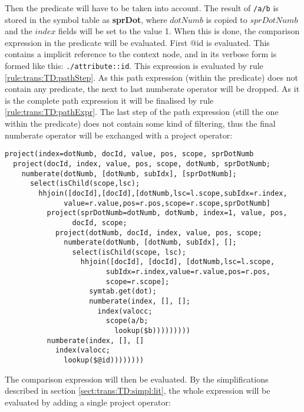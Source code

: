 Then the predicate will have to be taken into account. The result of \texttt{/a/b} is stored in the symbol table
as \textbf{sprDot}, where $dotNumb$ is copied to $sprDotNumb$ and the $index$ fields will be set to the
value 1. When this is done, the comparison expression in the predicate will be evaluated. First \textsf{@id} is
evaluated. This contains a implicit reference to the context node, and in its verbose form is formed like this:
\texttt{./attribute::id}. This expression is evaluated by rule \ref{rule:trans:TD:pathStep}. As this path
expression (within the predicate) does not contain any predicate, the next to last \textsf{numberate} operator
will be dropped. As it is the complete path expression it will be finalised by rule \ref{rule:trans:TD:pathExpr}.
The last step of the path expression (still the one within the predicate) does not contain some kind of filtering,
thus the final \textsf{numberate} operator will be exchanged with a \textsf{project} operator:

\begin{Verbatim}
project(index=dotNumb, docId, value, pos, scope, sprDotNumb
  project(docId, index, value, pos, scope, dotNumb, sprDotNumb;
    numberate(dotNumb, [dotNumb, subIdx], [sprDotNumb];
      select(isChild(scope,lsc);
        hhjoin([docId],[docId],[dotNumb,lsc=l.scope,subIdx=r.index,
              value=r.value,pos=r.pos,scope=r.scope,sprDotNumb]
          project(sprDotNumb=dotNumb, dotNumb, index=1, value, pos,
                docId, scope;
            project(dotNumb, docId, index, value, pos, scope;
              numberate(dotNumb, [dotNumb, subIdx], [];
                select(isChild(scope, lsc);
                  hhjoin([docId], [docId], [dotNumb,lsc=l.scope,
                        subIdx=r.index,value=r.value,pos=r.pos,
                        scope=r.scope];
                    symtab.get(dot);
                    numberate(index, [], [];
                      index(valocc;
                        scope(a/b;
                          lookup($b)))))))))
          numberate(index, [], []
            index(valocc;
              lookup($@id))))))))
\end{Verbatim}

The comparison expression will then be evaluated. By the simplifications described in section
\ref{sect:trans:TD:simpl:lit}, the whole expression will be evaluated by adding a single \textsf{project} operator:

